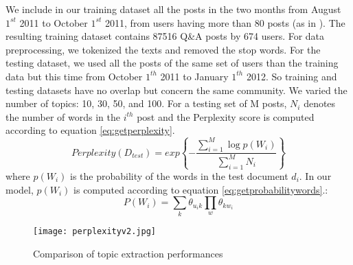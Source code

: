 {{{{{{{We include in our training dataset all the posts in the two months from August $1^{st}$ 2011 to October $1^{st}$ 2011, from users having more than 80 posts (as in \cite{yang2013cqarank}).
The resulting training dataset contains 87516 Q\&A posts by 674 users. For data preprocessing, we tokenized the texts and removed the stop words. For the testing dataset, we used all the posts of the same set of users than the training data but this time from October $1^{th}$ 2011 to January $1^{th}$ 2012. So training and testing datasets have no overlap but concern the same community. We varied the number of topics: 10, 30, 50, and 100. 
For a testing set of M posts, $N_i$ denotes the number of words in the $i^{th}$ post and the Perplexity score is computed according to equation \ref{eq:getperplexity}.
\begin{equation} %
  Perplexity(D_{test})=exp\left\{-\frac{\sum_{i=1}^{M}\log p(W_i)}{\sum_{i=1}^{M}N_i}\right\}
\label{eq:getperplexity}
\end{equation}
where $p(W_i)$ is the probability of the words in the test document $d_i$. In our model, $p(W_i)$ is computed according to equation \ref{eq:getprobabilitywords}.:%
\begin{equation}%
  P(W_i)=\sum_{k}\theta_{u_ik}\prod_{w} \theta_{kw_i}
\label{eq:getprobabilitywords}
\end{equation}
\begin{figure}[htp]
\centering
\texttt{[image: perplexityv2.jpg]}  %
\caption{Comparison of topic extraction performances}
\label{fig:perplexity} %
\end{figure}



}}}}}}}
